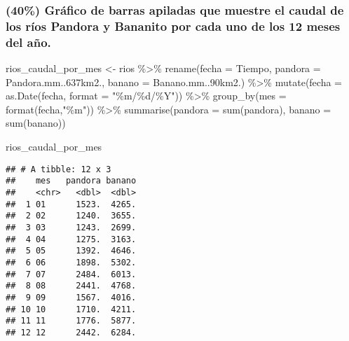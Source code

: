 \documentclass[
]{article}
\newenvironment{Shaded}{\begin{snugshade}}{\end{snugshade}}
\newcommand{\AttributeTok}[1]{\textcolor[rgb]{0.77,0.63,0.00}{#1}}
\newcommand{\FunctionTok}[1]{\textcolor[rgb]{0.00,0.00,0.00}{#1}}
\newcommand{\NormalTok}[1]{#1}
\newcommand{\OtherTok}[1]{\textcolor[rgb]{0.56,0.35,0.01}{#1}}
\newcommand{\SpecialCharTok}[1]{\textcolor[rgb]{0.00,0.00,0.00}{#1}}
\newcommand{\StringTok}[1]{\textcolor[rgb]{0.31,0.60,0.02}{#1}}
\begin{document}
\hypertarget{gruxe1fico-de-barras-apiladas-que-muestre-el-caudal-de-los-ruxedos-pandora-y-bananito-por-cada-uno-de-los-12-meses-del-auxf1o.}{%
\subsubsection{(40\%) Gráfico de barras apiladas que muestre el caudal
de los ríos Pandora y Bananito por cada uno de los 12 meses del
año.}\label{gruxe1fico-de-barras-apiladas-que-muestre-el-caudal-de-los-ruxedos-pandora-y-bananito-por-cada-uno-de-los-12-meses-del-auxf1o.}}

\begin{Shaded}
\begin{Highlighting}[]
\NormalTok{rios\_caudal\_por\_mes }\OtherTok{\textless{}{-}}
\NormalTok{  rios }\SpecialCharTok{\%\textgreater{}\%}
  \FunctionTok{rename}\NormalTok{(}\AttributeTok{fecha =}\NormalTok{ Tiempo,}
         \AttributeTok{pandora =}\NormalTok{ Pandora.mm..637km2.,}
         \AttributeTok{banano =}\NormalTok{ Banano.mm..90km2.) }\SpecialCharTok{\%\textgreater{}\%}
  \FunctionTok{mutate}\NormalTok{(}\AttributeTok{fecha =} \FunctionTok{as.Date}\NormalTok{(fecha, }\AttributeTok{format =} \StringTok{"\%m/\%d/\%Y"}\NormalTok{)) }\SpecialCharTok{\%\textgreater{}\%}
  \FunctionTok{group\_by}\NormalTok{(}\AttributeTok{mes =} \FunctionTok{format}\NormalTok{(fecha,}\StringTok{"\%m"}\NormalTok{)) }\SpecialCharTok{\%\textgreater{}\%}
  \FunctionTok{summarise}\NormalTok{(}\AttributeTok{pandora =} \FunctionTok{sum}\NormalTok{(pandora), }\AttributeTok{banano =} \FunctionTok{sum}\NormalTok{(banano))}

  
\NormalTok{rios\_caudal\_por\_mes}
\end{Highlighting}
\end{Shaded}

\begin{verbatim}
## # A tibble: 12 x 3
##    mes   pandora banano
##    <chr>   <dbl>  <dbl>
##  1 01      1523.  4265.
##  2 02      1240.  3655.
##  3 03      1243.  2699.
##  4 04      1275.  3163.
##  5 05      1392.  4646.
##  6 06      1898.  5302.
##  7 07      2484.  6013.
##  8 08      2441.  4768.
##  9 09      1567.  4016.
## 10 10      1710.  4211.
## 11 11      1776.  5877.
## 12 12      2442.  6284.
\end{verbatim}

\begin{Shaded}
\end{Shaded}
\end{document}
